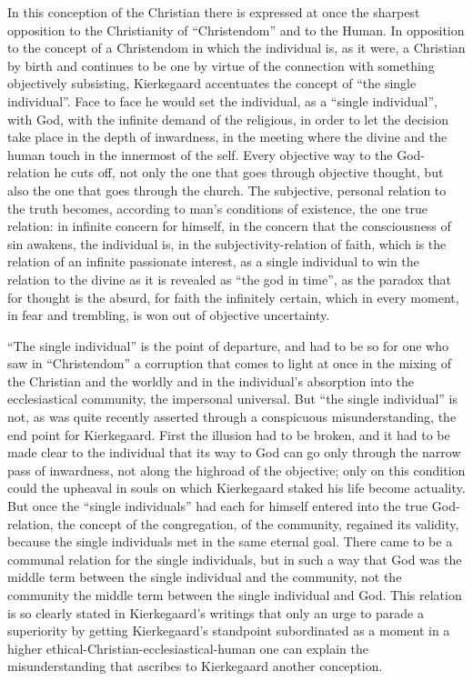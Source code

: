 \documentclass[12pt,a4paper,openany]{book}
\newcommand{\opage}[1]{\marginnote{\footnotesize\textit{[#1]}}}
\begin{document}
In this conception of the Christian there is expressed at once
the sharpest opposition to the Christianity of ``Christendom''
and to the Human. In opposition to the concept of a
Christendom in which the individual is, as it were, a Christian by birth
and continues to be one by virtue of the connection
\opage{435}with something objectively subsisting, Kierkegaard accentuates the concept
of ``the single individual''. Face to face he would set the individual,
as a ``single individual'', with God, with the infinite demand of the religious,
in order to let the decision take place in the depth of inwardness, in
the meeting where the divine and the human touch
in the innermost of the self. Every objective way to the God-relation
he cuts off, not only the one that goes through objective
thought, but also the one that goes through the church. The
subjective, personal relation to the truth becomes, according to
man's conditions of existence, the one true relation: in infinite
concern for himself, in the concern that the consciousness of sin
awakens, the individual is, in the subjectivity-relation of faith,
which is the relation of an infinite passionate interest, as a single individual
to win the relation to the divine as it
is revealed as ``the god in time'', as the paradox that
for thought is the absurd, for faith the infinitely certain,
which in every moment, in fear and trembling, is won out of
objective uncertainty.

``The single individual'' is the point of departure, and had to be so
for one who saw in ``Christendom'' a corruption that
comes to light at once in the mixing of the Christian
and the worldly and in the individual's absorption into the ecclesiastical
community, the impersonal universal. But ``the single individual'' is
not, as was quite recently asserted through a conspicuous misunderstanding,
the end point for Kierkegaard.
First the illusion had to be broken, and it had to
be made clear to the individual that its way to God can
go only through the narrow pass of inwardness, not along the highroad
of the objective; only on this condition could the upheaval
in souls on which Kierkegaard staked his life become
actuality. But once the ``single individuals'' had each for himself
entered into the true God-relation, the concept of the congregation,
of the community, regained its validity, because the single individuals
met in the same eternal goal. There came to be a communal relation
for the single individuals, but in such a way that God was the middle term
between the single individual and the community, not the community
\opage{436}the middle term between the single individual and God. This relation
is so clearly stated in Kierkegaard's writings that only an urge
to parade a superiority by getting Kierkegaard's
standpoint subordinated as a moment in a higher ethical-Christian-ecclesiastical-human
one can explain the misunderstanding that ascribes to
Kierkegaard another conception.
\end{document}
